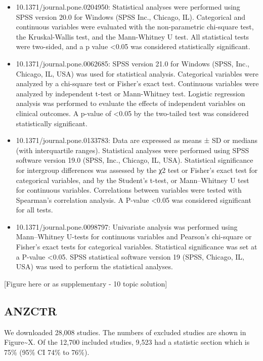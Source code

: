 \documentclass[
]{article}
\begin{document}
\begin{itemize}
\item
  10.1371/journal.pone.0204950: Statistical analyses were performed
  using SPSS version 20.0 for Windows (SPSS Inc., Chicago, IL).
  Categorical and continuous variables were evaluated with the
  non-parametric chi-square test, the Kruskal-Wallis test, and the
  Mann-Whitney U test. All statistical tests were two-sided, and a p
  value \textless0.05 was considered statistically significant.
\item
  10.1371/journal.pone.0062685: SPSS version 21.0 for Windows (SPSS,
  Inc., Chicago, IL, USA) was used for statistical analysis. Categorical
  variables were analyzed by a chi-square test or Fisher's exact test.
  Continuous variables were analyzed by independent t-test or
  Mann-Whitney test. Logistic regression analysis was performed to
  evaluate the effects of independent variables on clinical outcomes. A
  p-value of \textless0.05 by the two-tailed test was considered
  statistically significant.
\item
  10.1371/journal.pone.0133783: Data are expressed as means ± SD or
  medians (with interquartile ranges). Statistical analyses were
  performed using SPSS software version 19.0 (SPSS, Inc., Chicago, IL,
  USA). Statistical significance for intergroup differences was assessed
  by the χ2 test or Fisher's exact test for categorical variables, and
  by the Student's t-test, or Mann--Whitney U test for continuous
  variables. Correlations between variables were tested with Spearman's
  correlation analysis. A P-value \textless0.05 was considered
  significant for all tests.
\item
  10.1371/journal.pone.0098797: Univariate analysis was performed using
  Mann--Whitney U-tests for continuous variables and Pearson's
  chi-square or Fisher's exact tests for categorical variables.
  Statistical significance was set at a P-value \textless0.05. SPSS
  statistical software version 19 (SPSS, Chicago, IL, USA) was used to
  perform the statistical analyses.
\end{itemize}

{[}Figure here or as supplementary - 10 topic solution{]}

\hypertarget{anzctr}{%
\subsection{ANZCTR}\label{anzctr}}

We downloaded 28,008 studies. The numbers of excluded studies are shown
in Figure\textasciitilde X. Of the 12,700 included studies, 9,523 had a
statistic section which is 75\% (95\% CI 74\% to 76\%).
\end{document}
